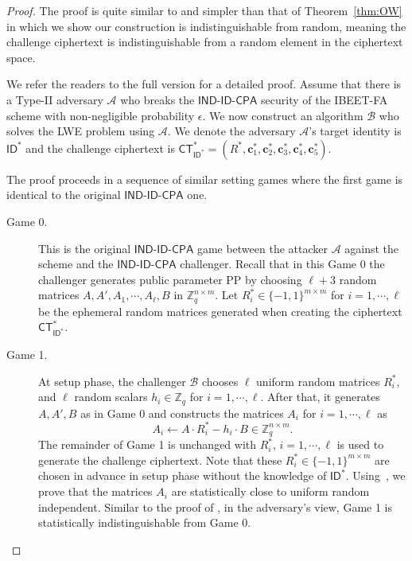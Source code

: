 \documentclass[runningheads,10pt]{llncs}
\def\ZZ{\mathbb{Z}}
\def\cal{\mathcal}
\def\bf{\mathbf}
\def\CT{\mathsf{CT}}
\def\Pr{\mathrm{Pr}}
\def\IND{\textsf{IND-ID-CPA}}
\def\c{\bf{c}}
\def\ID{\mathsf{ID}}
\def\W{\cal{W}}
\begin{document}
\begin{proof}	
	The proof is quite similar to and simpler than that of Theorem~\ref{thm:OW}  in which we  show our construction is indistinguishable from random, meaning the challenge ciphertext is indistinguishable from a random element in the ciphertext space. 
	
	We refer the readers  to the full version \cite{GWD+20-full} for a detailed proof.
	\iffalse
	Assume that there is a Type-II adversary $\cal{A}$ who breaks the $\IND$ security of the IBEET-FA scheme with non-negligible probability $\epsilon$. We now construct an algorithm $\cal{B}$ who solves the LWE problem using $\cal{A}$. We denote the adversary $\cal{A}$'s target identity is $\ID^*$ and the challenge ciphertext is $\CT_{\ID^*}^* = (R^*, \c_1^*, \c_2^*, \c_3^*, \c_4^*,\c_5^*)$.
	
	The proof proceeds in a sequence of similar setting games where the first game is identical to the original $\IND$ one.
	
	\begin{description}
		\item[Game 0.] This is the original $\IND$ game between the attacker $\cal{A}$ against the scheme and the $\IND$ challenger. Recall that in this Game 0 the challenger generates public parameter PP by choosing $\ell + 3$ random matrices $A, A', A_1, \cdots, A_\ell, B$ in $\ZZ_q^{n \times m}$. Let $R^*_i\in\{-1,1\}^{m\times m}$ for $i=1,\cdots,\ell$ be the ephemeral random matrices generated when creating the ciphertext $\CT_{\ID^*}^*$.\\
		
		\item[Game 1.] At setup phase, the challenger $\cal{B}$ chooses $\ell$ uniform random matrices $R_i^*$, and $\ell$ random scalars $h_i\in\ZZ_q$ for $i=1,\cdots,\ell$. After that, it generates $A, A', B$ as in Game 0 and constructs the matrices $A_i$ for $i=1,\cdots,\ell$ as
		$$A_i\gets A\cdot R^*_i-h_i\cdot B\in\ZZ_q^{n\times m}.$$
		The remainder of Game 1 is unchanged with $R_i^*$, $i=1,\cdots, \ell$ is used to generate the challenge ciphertext. Note that these $R^*_i\in\{-1,1\}^{m\times m}$ are chosen in advance in setup phase without the knowledge of $\ID^*$. Using~{\cite[Lemma 13]{ABB10-EuroCrypt}}, we prove that the matrices $A_i$ are statistically close to uniform random independent. Similar to the proof of {\cite[Theorem 25]{ABB10-EuroCrypt}}, in the adversary's view, Game 1 is statistically indistinguishable from Game 0.
		

\end{description}
\end{proof}
\end{document}

